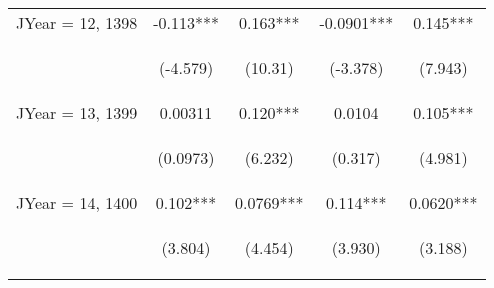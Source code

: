 \documentclass[]{article}
\begin{document}
\begin{center}
\begin{tabular}{lcccc}
        JYear = 12, 1398 & -0.113***                                       & 0.163***                                       & -0.0901***                                     & 0.145***                                       \\
        \vspace{4pt}     & \begin{footnotesize}(-4.579)\end{footnotesize}  & \begin{footnotesize}(10.31)\end{footnotesize}  & \begin{footnotesize}(-3.378)\end{footnotesize} & \begin{footnotesize}(7.943)\end{footnotesize}  \\
        JYear = 13, 1399 & 0.00311                                         & 0.120***                                       & 0.0104                                         & 0.105***                                       \\
        \vspace{4pt}     & \begin{footnotesize}(0.0973)\end{footnotesize}  & \begin{footnotesize}(6.232)\end{footnotesize}  & \begin{footnotesize}(0.317)\end{footnotesize}  & \begin{footnotesize}(4.981)\end{footnotesize}  \\
        JYear = 14, 1400 & 0.102***                                        & 0.0769***                                      & 0.114***                                       & 0.0620***                                      \\
        \vspace{4pt}     & \begin{footnotesize}(3.804)\end{footnotesize}   & \begin{footnotesize}(4.454)\end{footnotesize}  & \begin{footnotesize}(3.930)\end{footnotesize}  & \begin{footnotesize}(3.188)\end{footnotesize}  \\

\end{tabular}
\end{center}
\end{document}
